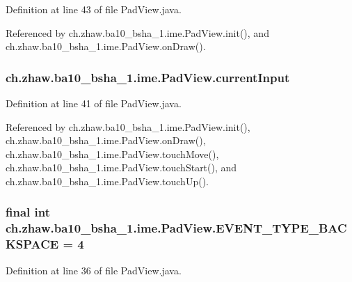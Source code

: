 Definition at line 43 of file PadView.java.

Referenced by ch.zhaw.ba10\_\-bsha\_\-1.ime.PadView.init(), and ch.zhaw.ba10\_\-bsha\_\-1.ime.PadView.onDraw().\hypertarget{classch_1_1zhaw_1_1ba10__bsha__1_1_1ime_1_1PadView_a6ff45debae1b93ccc68f309c62fe6885}{
\subsubsection[{currentInput}]{ {\bf ch.zhaw.ba10\_\-bsha\_\-1.ime.PadView.currentInput}}}
\label{classch_1_1zhaw_1_1ba10__bsha__1_1_1ime_1_1PadView_a6ff45debae1b93ccc68f309c62fe6885}


Definition at line 41 of file PadView.java.

Referenced by ch.zhaw.ba10\_\-bsha\_\-1.ime.PadView.init(), ch.zhaw.ba10\_\-bsha\_\-1.ime.PadView.onDraw(), ch.zhaw.ba10\_\-bsha\_\-1.ime.PadView.touchMove(), ch.zhaw.ba10\_\-bsha\_\-1.ime.PadView.touchStart(), and ch.zhaw.ba10\_\-bsha\_\-1.ime.PadView.touchUp().\hypertarget{classch_1_1zhaw_1_1ba10__bsha__1_1_1ime_1_1PadView_a1383a241ed874fd21ccfb9f661d34c5d}{
\subsubsection[{EVENT\_\-TYPE\_\-BACKSPACE}]{\setlength{\rightskip}{0pt plus 5cm}final int {\bf ch.zhaw.ba10\_\-bsha\_\-1.ime.PadView.EVENT\_\-TYPE\_\-BACKSPACE} = 4}}
\label{classch_1_1zhaw_1_1ba10__bsha__1_1_1ime_1_1PadView_a1383a241ed874fd21ccfb9f661d34c5d}


Definition at line 36 of file PadView.java.

